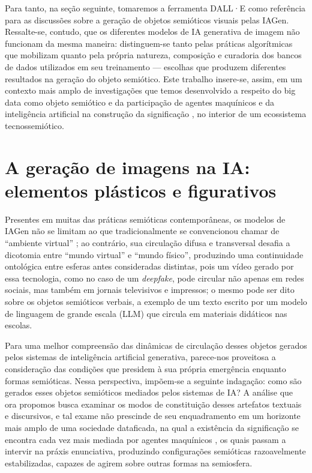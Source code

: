 \documentclass[portuguese]{textolivre}
\begin{document}
Para tanto, na seção seguinte, tomaremos a ferramenta DALL·E como referência para as discussões sobre a geração de objetos semióticos visuais pelas IAGen. Ressalte-se, contudo, que os diferentes modelos de IA generativa de imagem não funcionam da mesma maneira: distinguem-se tanto pelas práticas algorítmicas que mobilizam quanto pela própria natureza, composição e curadoria dos bancos de dados utilizados em seu treinamento — escolhas que produzem diferentes resultados na geração do objeto semiótico. Este trabalho insere-se, assim, em um contexto mais amplo de investigações que temos desenvolvido a respeito do big data como objeto semiótico \cite{moraes2021nocao,moraes2024semiotica} e da participação de agentes maquínicos e da inteligência artificial na construção da significação \cite{moraes2025semioticista,moraesdesousa2026construction}, no interior de um ecossistema tecnossemiótico.

\section{A geração de imagens na IA: elementos plásticos e figurativos}

Presentes em muitas das práticas semióticas \cite{fontanille2008pratiques} contemporâneas, os modelos de IAGen não se limitam ao que tradicionalmente se convencionou chamar de “ambiente virtual” \cite{levy1999cibercultura}; ao contrário, sua circulação difusa e transversal desafia a dicotomia entre “mundo virtual” e “mundo físico”, produzindo uma continuidade ontológica entre esferas antes consideradas distintas, pois um vídeo gerado por essa tecnologia, como no caso de um \textit{deepfake}, pode circular não apenas em redes sociais, mas também em jornais televisivos e impressos; o mesmo pode ser dito sobre os objetos semióticos verbais, a exemplo de um texto escrito por um modelo de linguagem de grande escala (LLM) que circula em materiais didáticos nas escolas.

Para uma melhor compreensão das dinâmicas de circulação desses objetos gerados pelos sistemas de inteligência artificial generativa, parece-nos proveitosa a consideração das condições que presidem à sua própria emergência enquanto formas semióticas. Nessa perspectiva, impõem-se a seguinte indagação: como são gerados esses objetos semióticos mediados pelos sistemas de IA? A análise que ora propomos busca examinar os modos de constituição desses artefatos textuais e discursivos, e tal exame não prescinde de seu enquadramento em um horizonte mais amplo de uma sociedade dataficada, na qual a existência da significação se encontra cada vez mais mediada por agentes maquínicos \cite{moraes2024semiotica}, os quais passam a intervir na práxis enunciativa, produzindo configurações semióticas razoavelmente estabilizadas, capazes de agirem sobre outras formas na semiosfera.
\end{document}
